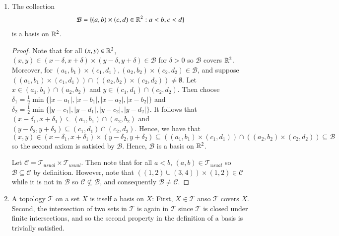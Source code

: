 \documentclass[12pt, a4paper, oneside, openright, titlepage]{book}
\begin{document}
\begin{example}
\begin{enumerate}
\begin{proof}
            \end{proof}
        \item The collection \begin{equation*}
                \mathcal{B} = \{(a,b)\times (c,d) \in \mathbb R^2: a < b, c < d\}
        \end{equation*}
            is a basis on $\mathbb R^2$.
            \begin{proof}
                Note that for all $(x,y) \in \mathbb R^2$, $(x,y) \in (x-\delta,x+\delta)\times (y-\delta,y+\delta) \in \mathcal{B}$ for $\delta > 0$ so $\mathcal{B}$ covers $\mathbb R^2$. Moreover, for $(a_1,b_1)\times (c_1,d_1),(a_2,b_2)\times(c_2,d_2) \in \mathcal{B}$, and suppose $((a_1,b_1)\times(c_1,d_1))\cap((a_2,b_2)\times(c_2,d_2)) \neq \emptyset$. Let $x \in (a_1,b_1) \cap(a_2,b_2)$ and $y \in (c_1,d_1)\cap(c_2,d_2)$. Then choose $\delta_1 = \frac{1}{2}\min\{|x-a_1|,|x-b_1|,|x-a_2|,|x-b_2|\}$ and $\delta_2 = \frac{1}{2}\min\{|y-c_1|,|y-d_1|,|y-c_2|,|y-d_2|\}$. It follows that $(x-\delta_1,x+\delta_1) \subseteq (a_1,b_1)\cap(a_2,b_2)$ and $(y-\delta_2,y+\delta_2)\subseteq (c_1,d_1)\cap(c_2,d_2)$. Hence, we have that $$(x,y) \in (x-\delta_1,x+\delta_1)\times(y-\delta_2,y+\delta_2) \subseteq ((a_1,b_1)\times(c_1,d_1))\cap((a_2,b_2)\times(c_2,d_2)) \subseteq \mathcal{B}$$ so the second axiom is satisied by $\mathcal{B}$. Hence, $\mathcal{B}$ is a basis on $\mathbb R^2$. 

                Let $\mathcal{C} = \mathcal{T}_{usual}\times\mathcal{T}_{usual}$. Then note that for all $a < b$, $(a,b) \in \mathcal{T}_{usual}$ so $\mathcal{B} \subseteq \mathcal{C}$ by definition. However, note that $((1,2)\cup(3,4)) \times (1,2) \in \mathcal{C}$ while it is not in $\mathcal{B}$ so $\mathcal{C} \nsubseteq \mathcal{B}$, and consequently $\mathcal{B} \neq \mathcal{C}$.
            \end{proof}
            \item A topology $\mathcal{T}$ on a set $X$ is itself a basis on $X$: First, $X \in \mathcal{T}$ anso $\mathcal{T}$ covers $X$. Second, the intersection of two sets in $\mathcal{T}$ is again in $\mathcal{T}$ since $\mathcal{T}$ is closed under finite intersections, and so the second property in the definition of a basis is trivially satisfied. 
    \end{enumerate}
\end{example}
\end{document}
